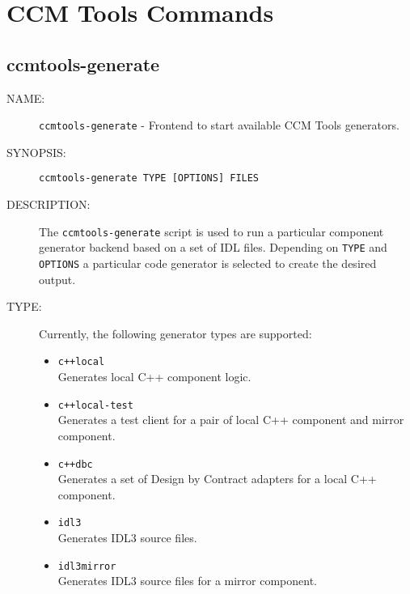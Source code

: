 
\chapter{CCM Tools Commands}

\section{ccmtools-generate}

\begin{description}

\item [NAME:] 
  {\tt ccmtools-generate} - Frontend to start available CCM Tools generators.

\item [SYNOPSIS:] 
  {\tt ccmtools-generate TYPE [OPTIONS] FILES}

\item [DESCRIPTION:]
The {\tt ccmtools-generate} script is used to run a particular component generator 
backend based on a set of IDL files. 
Depending on {\tt TYPE} and {\tt OPTIONS} a particular code generator is selected 
to create the desired output.

\item [TYPE:]
  Currently, the following generator types are supported:
  \begin{itemize}
  \item {\tt c++local}\\
    Generates local C++ component logic.
    
  \item {\tt c++local-test} \\
    Generates a test client for a pair of local C++ component and
    mirror component.
    
  \item {\tt c++dbc} \\
    Generates a set of Design by Contract adapters for a local
    C++ component.
    
  \item {\tt idl3 }\\
    Generates IDL3 source files.

  \item {\tt idl3mirror }\\
    Generates IDL3 source files for a mirror component.
    

\end{itemize}
\end{description}
